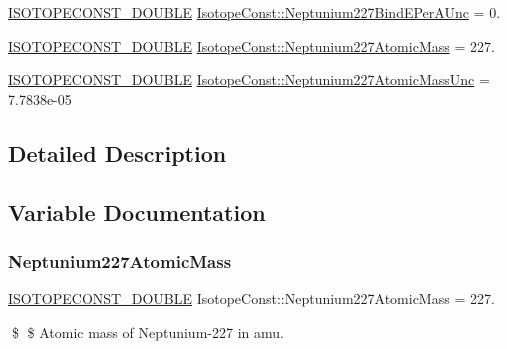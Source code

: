 \begin{DoxyCompactItemize}
\mbox{\hyperlink{group___isotope_const-_macros_ga8f45a7272ce02c0b4c65c44636ed719a}{I\+S\+O\+T\+O\+P\+E\+C\+O\+N\+S\+T\+\_\+\+D\+O\+U\+B\+LE}} \mbox{\hyperlink{group___isotope_const-_neptunium-_np227_ga92da7ebaa21d87480c5e61acba155df7}{Isotope\+Const\+::\+Neptunium227\+Bind\+E\+Per\+A\+Unc}} = 0.
\item 
\mbox{\hyperlink{group___isotope_const-_macros_ga8f45a7272ce02c0b4c65c44636ed719a}{I\+S\+O\+T\+O\+P\+E\+C\+O\+N\+S\+T\+\_\+\+D\+O\+U\+B\+LE}} \mbox{\hyperlink{group___isotope_const-_neptunium-_np227_ga153061c7fa5ea1ffec3232171181bc04}{Isotope\+Const\+::\+Neptunium227\+Atomic\+Mass}} = 227.
\item 
\mbox{\hyperlink{group___isotope_const-_macros_ga8f45a7272ce02c0b4c65c44636ed719a}{I\+S\+O\+T\+O\+P\+E\+C\+O\+N\+S\+T\+\_\+\+D\+O\+U\+B\+LE}} \mbox{\hyperlink{group___isotope_const-_neptunium-_np227_gab3fdcf140530c8e954a879272f2a1f14}{Isotope\+Const\+::\+Neptunium227\+Atomic\+Mass\+Unc}} = 7.\+7838e-\/05
\end{DoxyCompactItemize}


\subsection{Detailed Description}


\subsection{Variable Documentation}
\mbox{\label{group___isotope_const-_neptunium-_np227_ga153061c7fa5ea1ffec3232171181bc04}} 
\subsubsection{\texorpdfstring{Neptunium227\+Atomic\+Mass}{Neptunium227AtomicMass}}
{\footnotesize\ttfamily \mbox{\hyperlink{group___isotope_const-_macros_ga8f45a7272ce02c0b4c65c44636ed719a}{I\+S\+O\+T\+O\+P\+E\+C\+O\+N\+S\+T\+\_\+\+D\+O\+U\+B\+LE}} Isotope\+Const\+::\+Neptunium227\+Atomic\+Mass = 227.}

\$ \$ Atomic mass of Neptunium-\/227 in amu. \mbox{\label{group___isotope_const-_neptunium-_np227_gab3fdcf140530c8e954a879272f2a1f14}} 
